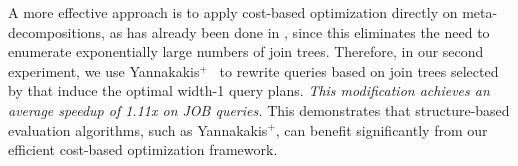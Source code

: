 A more effective approach is to apply cost-based optimization directly on meta-decompositions, as has already been done in \sys{}, since this eliminates the need to enumerate exponentially large numbers of join trees. Therefore, in our second experiment, we use Yannakakis$^+$~\cite{wang_yannakakis_2025} to rewrite queries based on join trees selected by \sys{} that induce the optimal width-1 query plans. \emph{This modification achieves an average speedup of {\rm 1.11x} on JOB queries.} This demonstrates that structure-based evaluation algorithms, such as Yannakakis$^+$, can benefit significantly from our efficient cost-based optimization framework.
